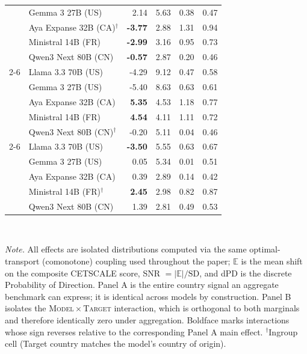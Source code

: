 \begin{table}[t]
\begin{small}
\begin{sc}
\begin{tabular}{llrrrc}
    & Gemma 3 27B (US)              &  2.14 & 5.63 & 0.38 & 0.47 \\
    & Aya Expanse 32B (CA)$^{\dagger}$ & \textbf{-3.77} & 2.88 & 1.31 & 0.94 \\
    & Ministral 14B (FR)            & \textbf{-2.99} & 3.16 & 0.95 & 0.73 \\
    & Qwen3 Next 80B (CN)          & \textbf{-0.57} & 2.87 & 0.20 & 0.46 \\
  \cmidrule(lr){2-6}
  \multirow{5}{*}{China}
    & Llama 3.3 70B (US)           & -4.29 & 9.12 & 0.47 & 0.58 \\
    & Gemma 3 27B (US)            & -5.40 & 8.63 & 0.63 & 0.61 \\
    & Aya Expanse 32B (CA)        & \textbf{ 5.35} & 4.53 & 1.18 & 0.77 \\
    & Ministral 14B (FR)         & \textbf{ 4.54} & 4.11 & 1.11 & 0.72 \\
    & Qwen3 Next 80B (CN)$^{\dagger}$ & -0.20 & 5.11 & 0.04 & 0.46 \\
  \cmidrule(lr){2-6}
  \multirow{5}{*}{France}
    & Llama 3.3 70B (US)         & \textbf{-3.50} & 5.55 & 0.63 & 0.67 \\
    & Gemma 3 27B (US)          &  0.05 & 5.34 & 0.01 & 0.51 \\
    & Aya Expanse 32B (CA)      &  0.39 & 2.89 & 0.14 & 0.42 \\
    & Ministral 14B (FR)$^{\dagger}$ & \textbf{ 2.45} & 2.98 & 0.82 & 0.87 \\
    & Qwen3 Next 80B (CN)      &  1.39 & 2.81 & 0.49 & 0.53 \\
  \bottomrule
  \end{tabular}
  \end{sc}
  \end{small}
  \\[2pt]
  \begin{flushleft}
  \footnotesize
  \textit{Note.} All effects are isolated distributions computed via the same
  optimal-transport (comonotone) coupling used throughout the paper; $\mathbb{E}$
  is the mean shift on the composite CETSCALE score, SNR $=|\mathbb{E}|/\text{SD}$,
  and dPD is the discrete Probability of Direction. Panel A is the entire
  country signal an aggregate benchmark can express; it is identical across
  models by construction. Panel B isolates the \textsc{Model}\,$\times$\,\textsc{Target}
  interaction, which is orthogonal to both marginals and therefore
  identically zero under aggregation. Boldface marks interactions whose sign
  reverses relative to the corresponding Panel A main effect. $^{\dagger}$Ingroup
  cell (Target country matches the model's country of origin).
  \end{flushleft}
\end{table}


